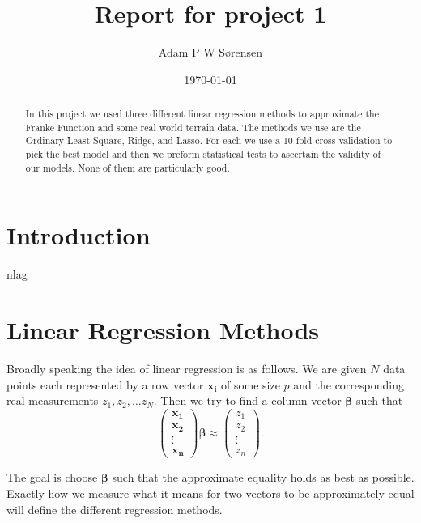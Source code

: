 \documentclass[parskip=half]{scrartcl}
\title{Report for project 1}
\date{\today}
\author{Adam P W S{\o}rensen}
\theoremstyle{definition}
\theoremstyle{remark}
\newcommand{\vect}[1]{{\bm{#1}}}
\begin{document}

\maketitle

\begin{abstract}
In this project we used three different linear regression methods to approximate the Franke Function and some real world terrain data. 
The methods we use are the Ordinary Least Square, Ridge, and Lasso. 
For each we use a 10-fold cross validation to pick the best model and then we preform statistical tests to ascertain the validity of our models. 
None of them are particularly good. 
\end{abstract}


\section{Introduction}

nlag

\section{Linear Regression Methods}
 
Broadly speaking the idea of linear regression is as follows.
We are given $N$ data points each represented by a row vector $\vect{x_i}$ of some size $p$ and the corresponding real measurements $z_1, z_2, \ldots z_N$. 
Then we try to find a column vector $\vect{\beta}$ such that 
\[
	\begin{pmatrix}
		\vect{x_1} \\
		\vect{x_2} \\
		\vdots \\
		\vect{x_n}
	\end{pmatrix} \vect{\beta}
	\approx
	\begin{pmatrix} z_1 \\ z_2 \\ \vdots \\ z_n \end{pmatrix}.	
\]

The goal is choose $\vect{\beta}$ such that the approximate equality holds as best as possible. 
Exactly how we measure what it means for two vectors to be approximately equal will define the different regression methods. 
\end{document}
